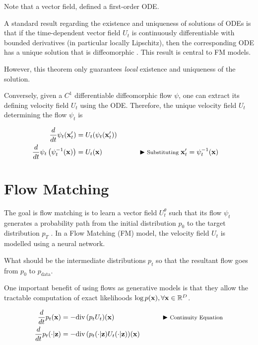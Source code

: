 \documentclass[a4paper, 11pt]{article}
\begin{document}
Note that a vector field, defined a first-order ODE.

A standard result regarding the existence and uniqueness of solutions of ODEs is that if the time-dependent vector field $U_t$ is continuously differentiable with bounded derivatives (in particular locally Lipschitz), then the corresponding ODE has a unique solution that is diffeomorphic \citep{perko2013differential}. This result is central to FM models. 

However, this theorem only guarantees \textit{local} existence and uniqueness of the solution. 

Conversely, given a $C^1$ differentiable diffeomorphic flow $\psi$, one can extract its defining velocity field $U_t$ using the ODE. Therefore, the unique velocity field $U_t$ determining the flow $\psi_t$ is 

\begin{align}
    \frac{d}{dt}\psi_t(\mbox{$\mbox{$\mathbf{x}$}$}'_t) &= U_t(\psi_t(\mbox{$\mbox{$\mathbf{x}$}$}'_t))\\
    \frac{d}{dt}\psi_t \left (\psi_t^{-1}(\mbox{$\mbox{$\mathbf{x}$}$}) \right) &= U_t(\mbox{$\mbox{$\mathbf{x}$}$}) && \qquad \blacktriangleright\text{\footnotesize Substituting }\mbox{$\mbox{$\mathbf{x}$}$}'_t = \psi_t^{-1}(\mbox{$\mbox{$\mathbf{x}$}$})
\end{align}



\section{Flow Matching}
The goal is flow matching is to learn a vector field $U_t^{\theta}$ such that its flow $\psi_t$ generates a probability path from the initial distribution $p_0$ to the target distribution $p_T$ \citep{lipman2024flow}. In a Flow Matching (FM) model, the velocity field $U_t$ is modelled using a neural network.

What should be the intermediate distributions $p_t$ so that the resultant flow goes from $p_0$ to $p_{\text{data}}$.

\begin{Takeaway}{}{}
    One important benefit of using flows as generative models is that they allow the tractable computation of exact likelihoods $\log p(\mbox{$\mbox{$\mathbf{x}$}$}), \forall \mbox{$\mbox{$\mathbf{x}$}$} \in \mathbb{R}^D$.
\end{Takeaway}


\begin{align}
    \frac{d}{dt} p_t(\mbox{$\mbox{$\mathbf{x}$}$}) &= - \text{div}\, (p_t U_t)(\mbox{$\mbox{$\mathbf{x}$}$}) && \qquad \blacktriangleright\text{\footnotesize Continuity Equation} \label{eq:contin-eq}\\ 
    \frac{d}{dt} p_t(\cdot | \mbox{$\mbox{$\mathbf{z}$}$}) &= - \text{div}\, (p_t(\cdot |\mbox{$\mbox{$\mathbf{z}$}$}) U_t(\cdot |\mbox{$\mbox{$\mathbf{z}$}$}))(\mbox{$\mbox{$\mathbf{x}$}$}) \label{eq:contin-cond-eq}
\end{align}
\end{document}
